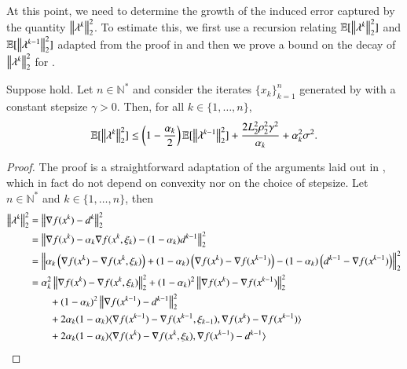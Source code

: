 \begin{toappendix}
At this point, we need to determine the growth of the induced error captured by the quantity $\left\Vert{\lambda^{k}}\right\Vert_2^2$. To estimate this, we first use a recursion relating $\mathbb{E}[\left\Vert{\lambda^{k}}\right\Vert_2^2]$ and $\mathbb{E}[\left\Vert{\lambda^{k-1}}\right\Vert_2^2]$ adapted from the proof in \citet[Lem. 6]{mokhtari2020stochastic} and then we prove a bound on the decay of $\left\Vert{\lambda^k}\right\Vert_2^2$ for .
\begin{lemma}\label{lem:uSCGerror}
    Suppose  hold. Let $n\in\mathbb{N}^*$ and consider the iterates $\{x_k\}_{k=1}^n$ generated by  with a constant stepsize $\gamma>0$. Then, for all $k\in\{1,\ldots,n
    \}$,
    \begin{equation*}
        \mathbb{E}[\left\Vert{\lambda^k}\right\Vert_2^2] \leq \left(1-\frac{\alpha_k}{2}\right)\mathbb{E}[\left\Vert{\lambda^{k-1}}\right\Vert_2^2] + \frac{2L_2^2\rho_2^2\gamma^2}{\alpha_k} + \alpha_k^2\sigma^2.
    \end{equation*}
\end{lemma}
\begin{proof}
    The proof is a straightforward adaptation of the arguments laid out in \citet[Lem. 6]{mokhtari2020stochastic}, which in fact do not depend on convexity nor on the choice of stepsize. Let $n\in\mathbb{N}^*$ and $k\in\{1,\ldots,n\}$, then
    \begin{equation*}
        \begin{aligned}
            \norm{\lambda^k}_2^2
                &= \norm{\nabla f(x^k) - d^{k}}_2^2\\
                &= \norm{\nabla f(x^k) - \alpha_k \nabla f(x^k,\xi_k) - (1-\alpha_k)d^{k-1}}_2^2\\
                &= \norm{\alpha_k\left(\nabla f(x^k) - \nabla f(x^k,\xi_k)\right) +(1-\alpha_k)\left(\nabla f(x^{k})-\nabla f(x^{k-1})\right) - (1-\alpha_k)\left(d^{k-1} - \nabla f(x^{k-1})\right)}_2^2\\
                &= \alpha_k^2\norm{\nabla f(x^k) - \nabla f(x^k,\xi_k)}_2^2 + (1-\alpha_k)^2\norm{\nabla f(x^k)-\nabla f(x^{k-1})}_2^2\\
                    &\quad\quad + (1-\alpha_k)^2\norm{\nabla f(x^{k-1})-d^{k-1}}_2^2\\
                    &\quad\quad +2\alpha_k(1-\alpha_k)\langle\nabla f(x^{k-1})-\nabla f(x^{k-1},\xi_{k-1}), \nabla f(x^k)-\nabla f(x^{k-1})\rangle\\
                    &\quad\quad +2\alpha_k(1-\alpha_k)\langle \nabla f(x^k)-\nabla f(x^k,\xi_k), \nabla f(x^{k-1})-d^{k-1}\rangle\\

\end{aligned}
\end{equation*}
\end{proof}
\end{toappendix}
